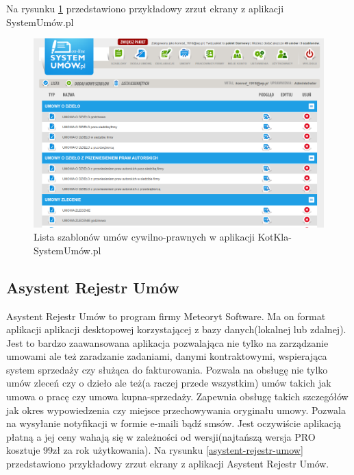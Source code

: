 Na rysunku \ref{kotkla-systemumow} przedstawiono przykładowy zrzut ekrany z aplikacji SystemUmów.pl

\begin{figure}[tdh]
    \begin{center}
	\includegraphics[scale=.4]{img/kotkla-systemumow.png}
	\caption{Lista szablonów umów cywilno-prawnych w aplikacji KotKla-SystemUmów.pl}
	\label{kotkla-systemumow}
    \end{center}
\end{figure}

\subsection[Asystent Rejestr Umów][Asystent Rejestr Umów]{Asystent Rejestr Umów}
Asystent Rejestr Umów to program firmy Meteoryt Software. Ma on format aplikacji aplikacji desktopowej korzystającej z bazy danych(lokalnej lub zdalnej). Jest to bardzo zaawansowana aplikacja pozwalająca nie tylko na zarządzanie umowami ale też zaradzanie zadaniami, danymi kontraktowymi, wspierająca system sprzedaży czy służąca do fakturowania. Pozwala na obsługę nie tylko umów zleceń czy o dzieło ale też(a raczej przede wszystkim) umów takich jak umowa o pracę czy umowa kupna-sprzedaży. Zapewnia obsługę takich szczegółów jak okres wypowiedzenia czy miejsce przechowywania oryginału umowy. Pozwala na wysyłanie notyfikacji w formie e-maili bądź smsów. Jest oczywiście aplikacją płatną a jej ceny wahają się w zależności od wersji(najtańszą wersja PRO kosztuje 99zł za rok użytkowania). Na rysunku \ref{asystent-rejestr-umow} przedstawiono przykładowy zrzut ekrany z aplikacji Asystent Rejestr Umów.

